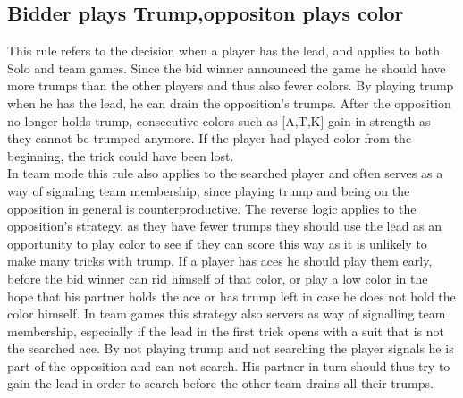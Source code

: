 \subsection{Bidder plays Trump,oppositon plays color}
This rule refers to the decision when a player has the lead, and applies to both Solo and team games.
Since the bid winner announced the game he should have more trumps than the other players and thus also fewer colors.
By playing trump when he has the lead, he can drain the opposition's trumps.
After the opposition no longer holds trump, consecutive colors such as [A,T,K] gain in strength as they cannot be
trumped anymore.
If the player had played color from the beginning, the trick could have been lost.\\
In team mode this rule also applies to the searched player and often serves as a way of signaling team membership,
since playing trump and being on the opposition in general is counterproductive.
\newline
The reverse logic applies to the opposition's strategy, as they have fewer trumps they should use the lead as an
opportunity to play color to see if they can score this way as it is unlikely to make many tricks
with trump.
If a player has aces he should play them early, before the bid winner can rid himself of that color, or play a low
color in the hope that his partner holds the ace or has trump left in case he does not hold the color himself.
\newline
In team games this strategy also servers as way of signalling team membership, especially if the lead in the first
trick opens with a suit that is not the searched ace.
By not playing trump and not searching the player signals he is part of the opposition and can not search.
His partner in turn should thus try to gain the lead in order to search before the other team drains all their trumps.
